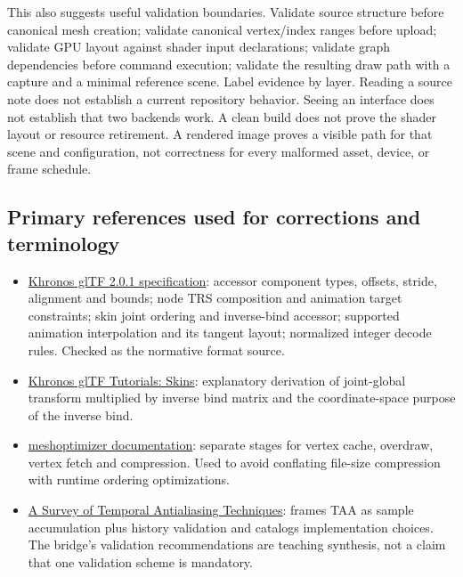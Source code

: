 This also suggests useful validation boundaries. Validate source structure before canonical mesh creation; validate canonical vertex/index ranges before upload; validate GPU layout against shader input declarations; validate graph dependencies before command execution; validate the resulting draw path with a capture and a minimal reference scene. Label evidence by layer. Reading a source note does not establish a current repository behavior. Seeing an interface does not establish that two backends work. A clean build does not prove the shader layout or resource retirement. A rendered image proves a visible path for that scene and configuration, not correctness for every malformed asset, device, or frame schedule.

\subsection{Primary references used for corrections and terminology}\label{primary-references-used-for-corrections-and-terminology}

\begin{itemize}
\tightlist
\item
  \href{https://registry.khronos.org/glTF/specs/2.0/glTF-2.0.html}{Khronos glTF 2.0.1 specification}: accessor component types, offsets, stride, alignment and bounds; node TRS composition and animation target constraints; skin joint ordering and inverse-bind accessor; supported animation interpolation and its tangent layout; normalized integer decode rules. Checked as the normative format source.
\item
  \href{https://github.com/KhronosGroup/glTF-Tutorials/blob/main/gltfTutorial/gltfTutorial_020_Skins.md}{Khronos glTF Tutorials: Skins}: explanatory derivation of joint-global transform multiplied by inverse bind matrix and the coordinate-space purpose of the inverse bind.
\item
  \href{https://meshoptimizer.org/}{meshoptimizer documentation}: separate stages for vertex cache, overdraw, vertex fetch and compression. Used to avoid conflating file-size compression with runtime ordering optimizations.
\item
  \href{https://diglib.eg.org/items/cfa6a05c-53b3-4ee1-979d-48abc6225f6b}{A Survey of Temporal Antialiasing Techniques}: frames TAA as sample accumulation plus history validation and catalogs implementation choices. The bridge's validation recommendations are teaching synthesis, not a claim that one validation scheme is mandatory.
\end{itemize}

